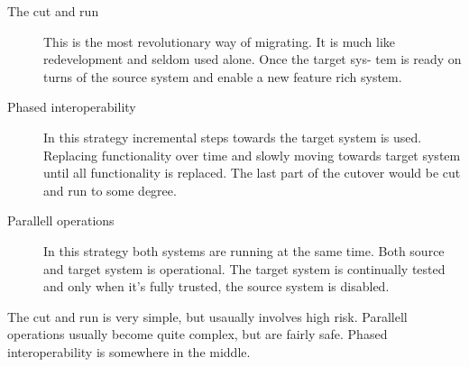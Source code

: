 \begin{description}
\item[The cut and run] This is the most revolutionary way of migrating. It is
much like redevelopment and seldom used alone. Once the target sys-
tem is ready on turns of the source system and enable a new feature
rich system.

\item[Phased interoperability] In this strategy incremental steps towards the
target system is used. Replacing functionality over time and slowly
moving towards target system until all functionality is replaced. The
last part of the cutover would be cut and run to some degree.

\item[Parallell operations] In this strategy both systems are running at the same
time. Both source and target system is operational. The target system
is continually tested and only when it's fully trusted, the source system
is disabled.
\end{description}

The cut and run is very simple, but usaually involves high risk. Parallell
operations usually become quite complex, but are fairly safe. Phased interoperability is somewhere in the middle.

\cite{leg:jdbj}
